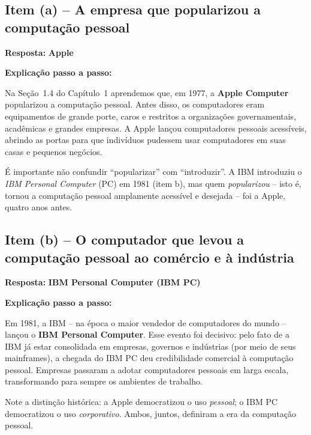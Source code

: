 \documentclass[12pt,a4paper]{article}
\begin{document}
\bigskip

\subsection*{Item (a) -- A empresa que popularizou a computação pessoal}

\begin{respostabox}
\textbf{Resposta:} \textcolor{deitelblue}{\textbf{Apple}}

\medskip
\textbf{Explicação passo a passo:}

Na Seção~1.4 do Capítulo~1 aprendemos que, em 1977, a \textbf{Apple Computer} popularizou a
computação pessoal. Antes disso, os computadores eram equipamentos de grande porte, caros e
restritos a organizações governamentais, acadêmicas e grandes empresas. A Apple lançou
computadores pessoais acessíveis, abrindo as portas para que indivíduos pudessem usar
computadores em suas casas e pequenos negócios.

\medskip
É importante não confundir ``popularizar'' com ``introduzir''. A IBM introduziu o
\textit{IBM Personal Computer} (PC) em 1981 (item b), mas quem \textit{popularizou} -- isto é,
tornou a computação pessoal amplamente acessível e desejada -- foi a Apple, quatro anos antes.
\end{respostabox}

\bigskip

\subsection*{Item (b) -- O computador que levou a computação pessoal ao comércio e à indústria}

\begin{respostabox}
\textbf{Resposta:} \textcolor{deitelblue}{\textbf{IBM Personal Computer (IBM PC)}}

\medskip
\textbf{Explicação passo a passo:}

Em 1981, a IBM -- na época o maior vendedor de computadores do mundo -- lançou o
\textbf{IBM Personal Computer}. Esse evento foi decisivo: pelo fato de a IBM já estar
consolidada em empresas, governos e indústrias (por meio de seus mainframes), a chegada do
IBM PC deu credibilidade comercial à computação pessoal. Empresas passaram a adotar
computadores pessoais em larga escala, transformando para sempre os ambientes de trabalho.

\medskip
Note a distinção histórica: a Apple democratizou o uso \textit{pessoal}; o IBM PC
democratizou o uso \textit{corporativo}. Ambos, juntos, definiram a era da computação pessoal.
\end{respostabox}
\end{document}

